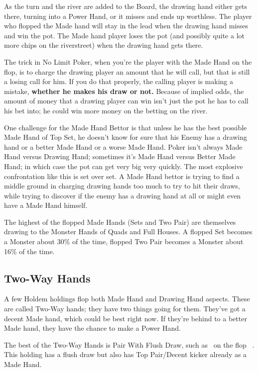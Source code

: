 As the turn and the river are added to the Board, the drawing hand
either gets there, turning into a Power Hand, or it misses and ends up
worthless. The player who flopped the Made hand will stay in the lead
when the drawing hand misses and win the pot. The Made hand player
loses the pot (and possibly quite a lot more chips on the riverstreet)
when the drawing hand gets there.

The trick in No Limit Poker, when you're the player with the Made Hand
on the flop, is to charge the drawing player an amount that he will
call, but that is still a losing call for him. If
you do that properly, the calling player is making a mistake,
\textbf{whether he makes his draw or not.} Because of implied odds,
the amount of money that a drawing player can win isn't just the pot
he has to call his bet into; he could win more money on the betting on
the river.

One challenge for the Made Hand Bettor is that unless he has the best
possible Made Hand of Top Set, he doesn't know for sure that his
Enemy has a drawing hand or a better Made Hand or a worse Made
Hand. Poker isn't always Made Hand versus Drawing Hand; sometimes it's
Made Hand versus Better Made Hand; in which case the pot can get very
big very quickly. The most explosive confrontation like this is set
over set. A Made Hand bettor is trying to find a middle ground in
charging drawing hands too much to try to hit their draws, while
trying to discover if the enemy has a drawing hand at all or might
even have a Made Hand himself.

The highest of the flopped Made Hands (Sets and Two Pair) are themselves
drawing to the Monster Hands of Quads and Full Houses. A flopped Set
becomes a Monster about 30\% of the time, flopped Two Pair becomes a
Monster about 16\% of the time.

\subsection{Two-Way Hands}

A few Holdem holdings flop both Made Hand and Drawing Hand aspects.
These are called Two-Way hands; they have two things going for them.
They've got a decent Made hand, which could be best right now.
If they're behind to a better Made hand, they have the chance to make
a Power Hand.

The best of the Two-Way Hands is Pair With Flush Draw, such as
\Kd\tend\ on the flop \Kc\nined\eigd\ . This holding has a flush
draw but also has Top Pair/Decent kicker already as a Made Hand.

